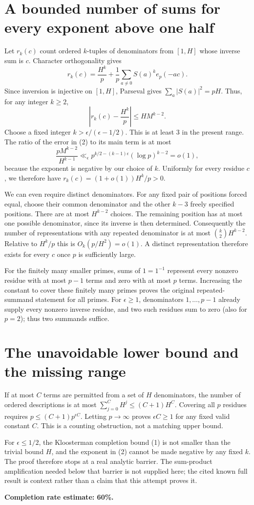 \documentclass[11pt]{article}
\begin{document}
\section*{A bounded number of sums for every exponent above one half}
Let $r_k(c)$ count ordered $k$-tuples of denominators from $[1,H]$ whose inverse sum is $c$. Character orthogonality gives
\[
 r_k(c)=\frac{H^k}{p}+\frac1p\sum_{a\ne0}S(a)^k e_p(-ac).
\]
Since inversion is injective on $[1,H]$, Parseval gives $\sum_a|S(a)|^2=pH$. Thus, for any integer $k\ge2$,
\[
 \left|r_k(c)-\frac{H^k}{p}\right|\le H M^{k-2}.\tag{2}
\]
Choose a fixed integer $k>\epsilon/(\epsilon-1/2)$. This is at least $3$ in the present range. The ratio of the error in (2) to its main term is at most
\[
 \frac{pM^{k-2}}{H^{k-1}}
 \ll_\epsilon p^{k/2-(k-1)\epsilon}(\log p)^{k-2}=o(1),
\]
because the exponent is negative by our choice of $k$. Uniformly for every residue $c$, we therefore have $r_k(c)=(1+o(1))H^k/p>0$.

We can even require distinct denominators. For any fixed pair of positions forced equal, choose their common denominator and the other $k-3$ freely specified positions. There are at most $H^{k-2}$ choices. The remaining position has at most one possible denominator, since its inverse is then determined. Consequently the number of representations with any repeated denominator is at most $\binom{k}{2}H^{k-2}$. Relative to $H^k/p$ this is $O_k(p/H^2)=o(1)$. A distinct representation therefore exists for every $c$ once $p$ is sufficiently large.

For the finitely many smaller primes, sums of $1=1^{-1}$ represent every nonzero residue with at most $p-1$ terms and zero with at most $p$ terms. Increasing the constant to cover these finitely many primes proves the original repeated-summand statement for all primes. For $\epsilon\ge1$, denominators $1,\ldots,p-1$ already supply every nonzero inverse residue, and two such residues sum to zero (also for $p=2$); thus two summands suffice.

\section*{The unavoidable lower bound and the missing range}
If at most $C$ terms are permitted from a set of $H$ denominators, the number of ordered descriptions is at most $\sum_{j=0}^C H^j\le(C+1)H^C$. Covering all $p$ residues requires $p\le(C+1)p^{\epsilon C}$. Letting $p\to\infty$ proves $\epsilon C\ge1$ for any fixed valid constant $C$. This is a counting obstruction, not a matching upper bound.

For $\epsilon\le1/2$, the Kloosterman completion bound (1) is not smaller than the trivial bound $H$, and the exponent in (2) cannot be made negative by any fixed $k$. The proof therefore stops at a real analytic barrier. The sum-product amplification needed below that barrier is not supplied here; the cited known full result is context rather than a claim that this attempt proves it.

\textbf{Completion rate estimate: 60\%.}
\end{document}
